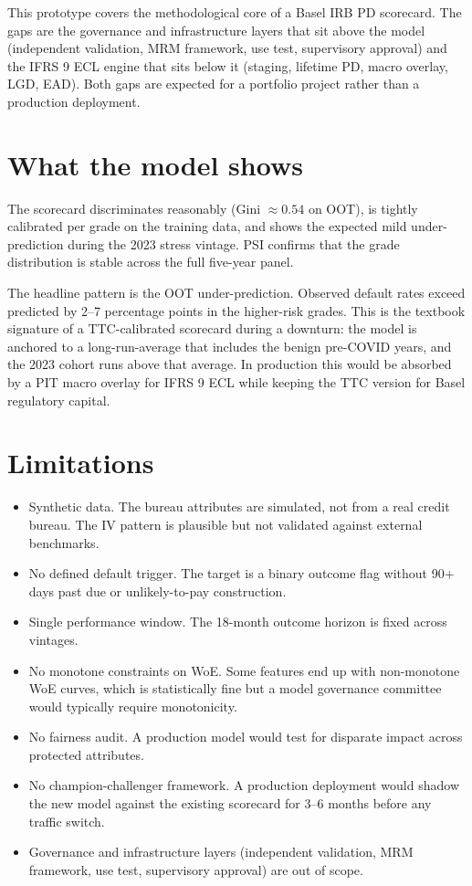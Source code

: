 \documentclass[a4paper,11pt]{article}
\begin{document}
This prototype covers the methodological core of a Basel IRB PD
scorecard. The gaps are the governance and infrastructure layers that
sit above the model (independent validation, MRM framework, use test,
supervisory approval) and the IFRS 9 ECL engine that sits below it
(staging, lifetime PD, macro overlay, LGD, EAD). Both gaps are
expected for a portfolio project rather than a production deployment.

\section{What the model shows}

The scorecard discriminates reasonably (Gini $\approx 0.54$ on OOT),
is tightly calibrated per grade on the training data, and shows the
expected mild under-prediction during the 2023 stress vintage. PSI
confirms that the grade distribution is stable across the full
five-year panel.

The headline pattern is the OOT under-prediction. Observed default
rates exceed predicted by 2--7 percentage points in the higher-risk
grades. This is the textbook signature of a TTC-calibrated scorecard
during a downturn: the model is anchored to a long-run-average that
includes the benign pre-COVID years, and the 2023 cohort runs above
that average. In production this would be absorbed by a PIT macro
overlay for IFRS 9 ECL while keeping the TTC version for Basel
regulatory capital.

\section{Limitations}

\begin{itemize}
\item Synthetic data. The bureau attributes are simulated, not from a
real credit bureau. The IV pattern is plausible but not validated
against external benchmarks.
\item No defined default trigger. The target is a binary outcome flag
without 90+ days past due or unlikely-to-pay construction.
\item Single performance window. The 18-month outcome horizon is
fixed across vintages.
\item No monotone constraints on WoE. Some features end up with
non-monotone WoE curves, which is statistically fine but a model
governance committee would typically require monotonicity.
\item No fairness audit. A production model would test for disparate
impact across protected attributes.
\item No champion-challenger framework. A production deployment would
shadow the new model against the existing scorecard for 3--6 months
before any traffic switch.
\item Governance and infrastructure layers (independent validation,
MRM framework, use test, supervisory approval) are out of scope.
\end{itemize}
\end{document}
